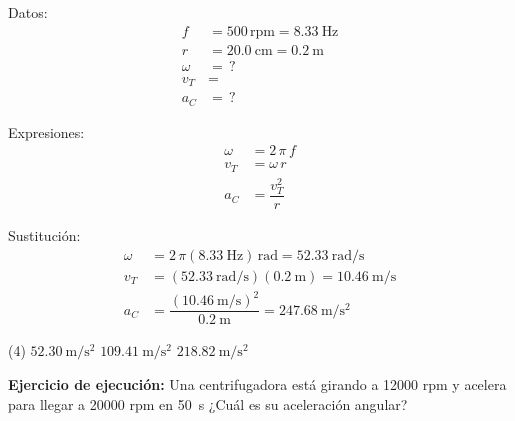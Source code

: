 \documentclass[12pt, letter]{exam}
\begin{document}
\begin{questions}
    \begin{minipage}[t]{0.4\linewidth}
    Datos: 
    \begin{align*}
    f &= 500 \, \text{rpm} = \SI{8.33}{\hertz} \\
    r &= \SI{20.0}{\centi\meter} = \SI{0.2}{\meter} \\
    \omega &= \, ? \\
    v_{T} &= \, \\
    a_{C} &= \, ?
    \end{align*}
    \end{minipage}
    \hspace{1cm}
    \begin{minipage}[t]{0.4\linewidth}
    Expresiones:
    \begin{align*}
    \omega &= 2 \, \pi \, f \\
    v_{T} &= \omega \, r \\
    a_{C} &= \dfrac{v_{T}^{2}}{r}
    \end{align*}
    \end{minipage}

    Sustitución:
    \begin{align*}
    \omega &= 2 \, \pi (\SI{8.33}{\hertz}) \, \unit{\radian} = \SI[per-mode=fraction]{52.33}{\radian\per\second} \\
    v_{T} &= \left( \SI{52.33}{\radian\per\second} \right) (\SI{0.2}{\meter}) = \SI[per-mode=fraction]{10.46}{\meter\per\second} \\
    a_{C} &= \dfrac{\left( \displaystyle \SI[per-mode=fraction]{10.46}{\meter\per\second} \right)^{2}}{\SI{0.2}{\meter}} = \SI[per-mode=fraction]{247.68}{\meter\per\square\second}
    \end{align*}

    \vspace{0.3cm}
    \begin{tasks}(4)
        \task $\displaystyle \SI[per-mode=fraction]{52.30}{\meter\per\square\second}$
        \task {}
        \task $\displaystyle \SI[per-mode=fraction]{109.41}{\meter\per\square\second}$
        \task $\displaystyle \SI[per-mode=fraction]{218.82}{\meter\per\square\second}$
    \end{tasks}
    \question \label{Ejercicio_03} \textbf{Ejercicio de ejecución: } Una centrifugadora está girando a 12000 rpm y acelera para llegar a 20000 rpm en \SI{50}{\second} ¿Cuál es su aceleración angular?


\end{questions}
\end{document}
